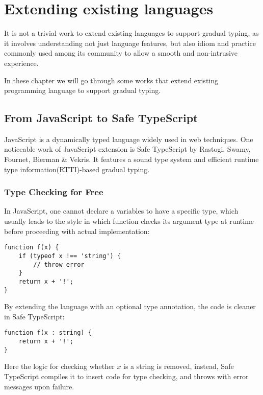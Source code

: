 
\renewcommand{\thechapter}{2}

\chapter{Extending existing languages}

It is not a trivial work to extend existing languages to support gradual typing,
as it involves understanding not just language features,
but also idiom and practice commonly used among its community to allow
a smooth and non-intrusive experience.

In these chapter we will go through some works that extend existing programming
language to support gradual typing.

\section{From JavaScript to Safe TypeScript}

JavaScript is a dynamically typed language widely used in web techniques.
One noticeable work of JavaScript extension is Safe TypeScript by Rastogi, Swamy, Fournet, Bierman \& Vekris.
It features a sound type system and efficient runtime type information(RTTI)-based
gradual typing.

\subsection{Type Checking for Free}

In JavaScript, one cannot declare a variables to have a specific type,
which usually leads to the style in which function checks its argument type at runtime
before proceeding with actual implementation:

\begin{verbatim}
function f(x) {
    if (typeof x !== 'string') {
        // throw error
    }
    return x + '!';
}
\end{verbatim}

By extending the language with an optional type annotation,
the code is cleaner in Safe TypeScript: 

\begin{verbatim}
function f(x : string) {
    return x + '!';
}
\end{verbatim}

Here the logic for checking whether $x$ is a string is removed,
instead, Safe TypeScript compiles it to insert code for type checking,
and throws with error messages upon failure.

